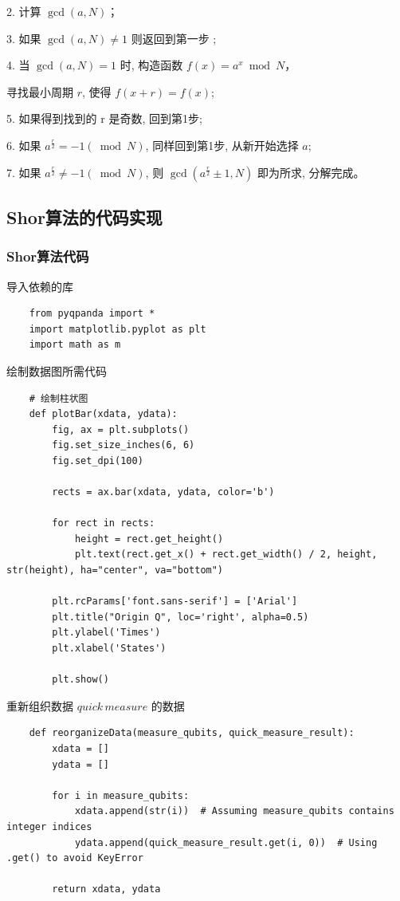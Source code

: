 \documentclass[12pt,hyperref,a4paper,UTF8]{ctexart}
\begin{document}
2. 计算 $\operatorname{gcd}(a, N)$；

3. 如果 $\operatorname{gcd}(a, N) \neq 1$ 则返回到第一步 ;

4. 当 $\operatorname{gcd}(a, N)=1$ 时, 构造函数 $f(x)=a^x \bmod N$，

\quad 寻找最小周期 $r$, 使得 $f(x+r)=f(x)$;

5. 如果得到找到的 $\mathrm{r}$ 是奇数, 回到第1步;

6. 如果 $a^{\frac{r}{2}}=-1(\bmod N)$, 同样回到第1步, 从新开始选择 $a$;

7. 如果 $a^{\frac{r}{2}} \neq-1(\bmod N)$, 则 $\operatorname{gcd}\left(a^{\frac{r}{2}} \pm 1, N\right)$ 即为所求, 分解完成。

\subsection{Shor算法的代码实现}

\subsubsection{Shor算法代码}
导入依赖的库
\begin{lstlisting}
    from pyqpanda import *
    import matplotlib.pyplot as plt
    import math as m
\end{lstlisting}

绘制数据图所需代码
\begin{lstlisting}
    # 绘制柱状图
    def plotBar(xdata, ydata):
        fig, ax = plt.subplots()
        fig.set_size_inches(6, 6)
        fig.set_dpi(100)

        rects = ax.bar(xdata, ydata, color='b')

        for rect in rects:
            height = rect.get_height()
            plt.text(rect.get_x() + rect.get_width() / 2, height, str(height), ha="center", va="bottom")

        plt.rcParams['font.sans-serif'] = ['Arial']
        plt.title("Origin Q", loc='right', alpha=0.5)
        plt.ylabel('Times')
        plt.xlabel('States')

        plt.show()
\end{lstlisting}

重新组织数据 $quick\, measure$ 的数据
\begin{lstlisting}
    def reorganizeData(measure_qubits, quick_measure_result):
        xdata = []
        ydata = []

        for i in measure_qubits:
            xdata.append(str(i))  # Assuming measure_qubits contains integer indices
            ydata.append(quick_measure_result.get(i, 0))  # Using .get() to avoid KeyError

        return xdata, ydata
\end{lstlisting}
\end{document}
